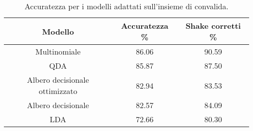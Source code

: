 \begin{table}[H]
\centering
\caption{Accuratezza per i modelli adattati sull'insieme di convalida.}
\begin{tabular}{ccc}
\toprule
                        Modello &  Accuratezza \% &  Shake corretti \% \\
\midrule
                   Multinomiale &          86.06 &             90.59 \\
                            QDA &          85.87 &             87.50 \\
 Albero decisionale ottimizzato &          82.94 &             83.53 \\
             Albero decisionale &          82.57 &             84.09 \\
                            LDA &          72.66 &             80.30 \\
\bottomrule
\end{tabular}
\label{tab:acc}
\end{table}